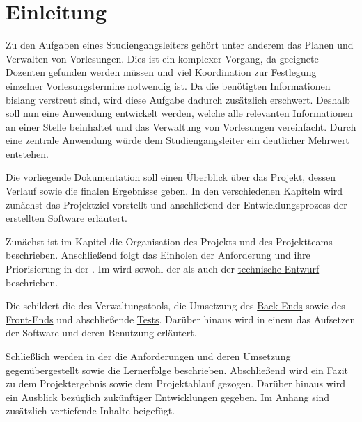 \chapter{Einleitung}
Zu den Aufgaben eines Studiengangsleiters gehört unter anderem das Planen und Verwalten von Vorlesungen.
Dies ist ein komplexer Vorgang, da geeignete Dozenten gefunden werden müssen und viel Koordination zur Festlegung einzelner Vorlesungstermine notwendig ist.
Da die benötigten Informationen bislang verstreut sind, wird diese Aufgabe dadurch zusätzlich erschwert.
Deshalb soll nun eine Anwendung entwickelt werden, welche alle relevanten Informationen an einer Stelle beinhaltet und das Verwaltung von Vorlesungen vereinfacht.
Durch eine zentrale Anwendung würde dem Studiengangsleiter ein deutlicher Mehrwert entstehen.

Die vorliegende Dokumentation soll einen Überblick über das Projekt, dessen Verlauf sowie die finalen Ergebnisse geben.
In den verschiedenen Kapiteln wird zunächst das Projektziel vorstellt und anschließend der Entwicklungsprozess der erstellten Software erläutert.

Zunächst ist im Kapitel  die Organisation des Projekts und des Projektteams beschrieben.
Anschließend folgt das Einholen der Anforderung und ihre Priorisierung in der .
Im  wird sowohl der  als auch der \hyperref[ch:Technischer Entwurf]{technische Entwurf} beschrieben.

Die  schildert die  des Verwaltungstools, die Umsetzung des \hyperref[ch:BackEnd]{Back-Ends} sowie des \hyperref[ch:FrontEnd]{Front-Ends} und abschließende \hyperref[ch:Test]{Tests}.
Darüber hinaus wird in einem  das Aufsetzen der Software und deren Benutzung erläutert.

Schließlich werden in der  die Anforderungen und deren Umsetzung gegenübergestellt sowie die Lernerfolge beschrieben.
Abschließend wird ein Fazit zu dem Projektergebnis sowie dem Projektablauf gezogen.
Darüber hinaus wird ein Ausblick bezüglich zukünftiger Entwicklungen gegeben.
Im Anhang sind zusätzlich vertiefende Inhalte beigefügt.